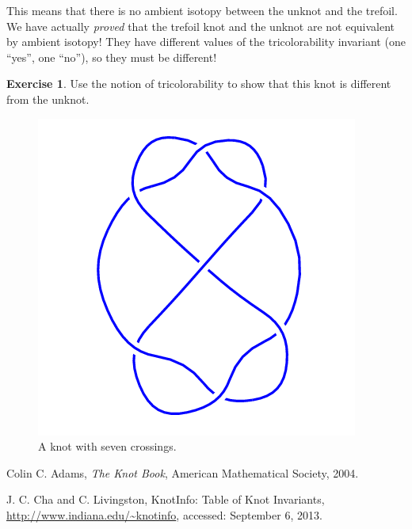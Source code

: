 \documentclass[12pt,letterpaper]{article}
\theoremstyle{definition}
\newtheorem{exercise}[question]{Exercise}
\begin{document}
This means that there is no ambient isotopy between the unknot and the trefoil.
We have actually \emph{proved} that the trefoil knot and the unknot are not equivalent by ambient isotopy! They have different values of the tricolorability invariant (one ``yes'', one ``no''), so they must be different!


\begin{exercise}
Use the notion of tricolorability to show that this knot is different from the unknot.
\end{exercise}

\begin{figure}[h]
    \centering
    \includegraphics[width=.5\textwidth]{knotpics/7_4.png}
    \caption{A knot with seven crossings.}
\end{figure}

\begin{thebibliography}{9}

	Colin C. Adams,
	\emph{The Knot Book},
	American Mathematical Society,
	2004.

	J. C. Cha and C. Livingston,
	KnotInfo: Table of Knot Invariants,
	\url{http://www.indiana.edu/~knotinfo},
	accessed: September 6, 2013.


\end{thebibliography}
\end{document}
